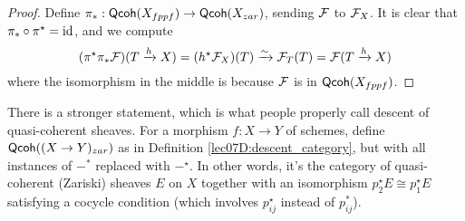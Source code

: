  \begin{proof}
   Define $\pi_*:\text{\sf Qcoh}(X_{fppf})\to \text{\sf Qcoh}(X_{zar})$, sending $\mathcal{F}$ to $\mathcal{F}_X$. It is clear
   that $\pi_*\circ \pi^\star =\operatorname{id}$, and we compute
   \[
     (\pi^\star \pi_* \mathcal{F})(T\xrightarrow h X) = (h^\star \mathcal{F}_X)(T)\xrightarrow{\sim}
     \mathcal{F}_T(T) = \mathcal{F}(T\xrightarrow h X)
   \]
   where the isomorphism in the middle is because $\mathcal{F}$ is in $\text{\sf Qcoh}(X_{fppf})$.
 \end{proof}
 There is a stronger statement, which is what people properly call descent of
 quasi-coherent sheaves.
For a morphism $f\colon X\to Y$ of schemes, define $\text{\sf Qcoh}((X\to Y)_{zar})$ as in Definition \ref{lec07D:descent_category}, but with all instances of $-^*$ replaced with $-^\star$. In other words, it's the category of quasi-coherent (Zariski) sheaves $E$ on $X$ together with an isomorphism $p_2^\star E\cong p_1^\star E$ satisfying a cocycle condition (which involves $p_{ij}^\star$ instead of $p_{ij}^*$).
